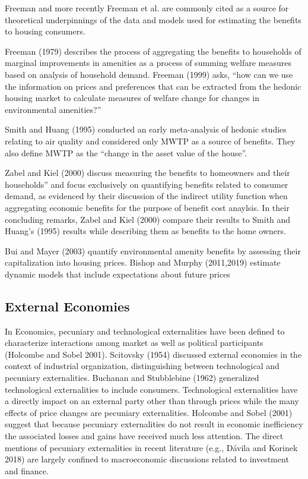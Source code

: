 \documentclass[ecta,nameyear,draft]{econsocart}
\theoremstyle{plain}
\theoremstyle{remark}
\begin{document}
Freeman and more recently Freeman et al. are commonly cited as a source for theoretical underpinnings of the data and models used for estimating the benefits to housing consumers.  

Freeman (1979) describes the process of aggregating the benefits to households of marginal improvements in amenities as a process of summing welfare measures based on analysis of household demand. Freeman (1999) asks, “how can we use the information on prices and preferences that can be extracted from the hedonic housing market to calculate  measures of welfare change for changes in environmental amenities?” 



Smith and Huang (1995) conducted an early meta-analysis of hedonic studies relating to air quality and considered only MWTP as a source of benefits. They also define MWTP as the “change in the asset value of the house”. 

Zabel and Kiel (2000) discuss measuring the benefits to homeowners and their households” and focus exclusively on quantifying benefits related to consumer demand, as evidenced by their discussion of the indirect utility function when aggregating economic benefits for the purpose of benefit cost anaylsis. In their concluding remarks, Zabel and Kiel (2000) compare their results to Smith and Huang’s (1995) results while describing them as benefits to the home owners. 

Bui and Mayer (2003) quantify environmental amenity benefits by assessing their capitalization into housing prices. Bishop and Murphy (2011,2019) estimate dynamic models that include expectations about future prices 



\subsection{External Economies} 

In Economics, pecuniary and technological externalities have been defined to characterize interactions among market as well as political participants (Holcombe and Sobel 2001). Scitovsky (1954) discussed external economies in the context of industrial organization, distinguishing between technological and pecuniary externalities. Buchanan and Stubblebine (1962) generalized technological externalities to include consumers. Technological externalities have a directly impact on an external party other than through prices while the many effects of price changes are pecuniary externalities. Holcombe and Sobel (2001) suggest that because pecuniary externalities do not result in economic inefficiency the associated losses and gains have received much less attention. The direct mentions of pecuniary externalities in recent literature (e.g., Dávila and Korinek 2018) are largely confined to macroeconomic discussions related to investment and finance. 
\end{document}
